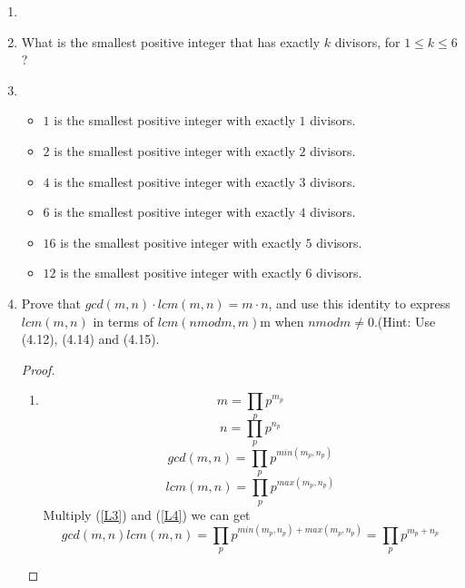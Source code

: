 \documentclass[12pt,a4paper]{article}
\makeatletter
\newtheorem*{solution}{Solution}
\theoremstyle{definition}
\renewenvironment{solution}[1][Solution] {\par\pushQED{\qed}\normalfont\topsep6\p@\@plus6\p@\relax\trivlist\item[\hskip\labelsep\bfseries#1\@addpunct{.}]\ignorespaces}{\popQED\endtrivlist\@endpefalse} \makeatother
\makeatother
\begin{document}
\begin{enumerate}
\begin{solution}
        \end{solution}
    \item 
        What is the smallest positive integer that has exactly $k$ divisors, for $1\le k\le 6$?
        \begin{solution}
        	\begin{itemize}
        		\item 
        		    $1$ is the smallest positive integer with exactly $1$ divisors.
        		\item 
        		    $2$ is the smallest positive integer with exactly $2$ divisors.
        		\item 
        		    $4$ is the smallest positive integer with exactly $3$ divisors.
        		\item 
        		    $6$ is the smallest positive integer with exactly $4$ divisors.
        		\item 
        		    $16$ is the smallest positive integer with exactly $5$ divisors.
        		\item 
        		    $12$ is the smallest positive integer with exactly $6$ divisors.
            \end{itemize}
        \end{solution}
    \item 
        Prove that $gcd(m,n)\cdot lcm(m,n)=m\cdot n$, and use this identity to express $lcm(m,n)$ in terms of $lcm(n mod m,m)$m when $n mod m \neq 0$.{\color{blue}(Hint: Use (4.12), (4.14) and (4.15).}
        \begin{proof}
        	\begin{enumerate}
        		\item 
        		\begin{equation}\label{L1}
        		m=\prod_{p}p^{m_p}
        		\end{equation}
        		\begin{equation}\label{L2}
        		n=\prod_{p}p^{n_p}
        		\end{equation}
        		\begin{equation}\label{L3}
        		gcd(m,n)=\prod_{p}p^{min(m_p,n_p)}
        		\end{equation}
        		\begin{equation}\label{L4}
        		lcm(m,n)=\prod_{p}p^{max(m_p,n_p)}
        		\end{equation}
        		Multiply (\ref{L3}) and (\ref{L4}) we can get
        		\begin{equation}
        		gcd(m,n)lcm(m,n)=\prod_{p}p^{min(m_p,n_p)+max(m_p,n_p)}=\prod_{p}p^{m_p+n_p}

\end{equation}
\end{enumerate}
\end{proof}
\end{enumerate}
\end{document}
